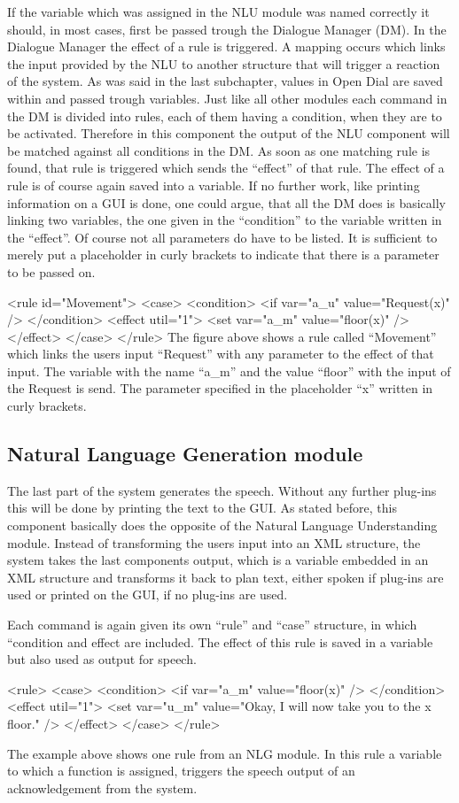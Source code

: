 If the variable which was assigned in the NLU module was named correctly it should, in most cases, first be passed trough the Dialogue Manager (DM).
In the Dialogue Manager the effect of a rule is triggered. A mapping occurs which links the input provided by the NLU to another structure that will trigger a reaction of the system.
As was said in the last subchapter, values in Open Dial are saved within and passed trough variables. 
Just like all other modules each command in the DM is divided into rules, each of them having a condition, when they are to be activated. 
Therefore in this component the output of the NLU component will be matched against all conditions in the DM. 
As soon as one matching rule is found, that rule is triggered which sends the “effect” of that rule.
The effect of a rule is of course again saved into a variable.
If no further work, like printing information on a GUI is done, one could argue, that all the DM does is basically linking two variables, the one given in the “condition” to the variable written in the “effect”.
Of course not all parameters do have to be listed.
It is sufficient to merely put a placeholder in curly brackets to indicate that there is a parameter to be passed on.


		<rule id="Movement">
			<case>
				<condition>
					<if var="a_u" value="Request({x})" />
				</condition>
				<effect util="1">
					<set var="a_m" value="floor({x})" />
				</effect>
			</case>
		</rule>
The figure above shows  a rule called “Movement” which links the users input “Request” with any parameter to the effect of that input.
The variable with the name “a_m” and the value “floor” with the input of the Request is send.
The parameter specified in the placeholder “x” written in curly brackets.

\subsection{Natural Language Generation module}

The last part of the system generates the speech. 
Without any further plug-ins this will be done by printing the text to the GUI.
As stated before, this component basically does the opposite of the Natural Language Understanding module. 
Instead of transforming the users input into an XML structure, the system takes the last components output, which is a variable embedded in an XML structure and transforms it back to plan text, either spoken if plug-ins are used or printed on the GUI, if no plug-ins are used.

Each command is again given its own “rule” and “case” structure, in which “condition and effect are included. 
The effect of this rule is saved in a variable but also used as output for speech.

<rule> 
<case>
				<condition>
					<if var="a_m" value="floor({x})" />
				</condition>
				<effect util="1">
					<set var="u_m" value="Okay, I will now take you to the {x} floor." />
				</effect>
			</case>
</rule>

The example above shows one rule from an NLG module. 
In this rule a variable to which a function  is assigned, triggers the speech output of an acknowledgement from the system.

